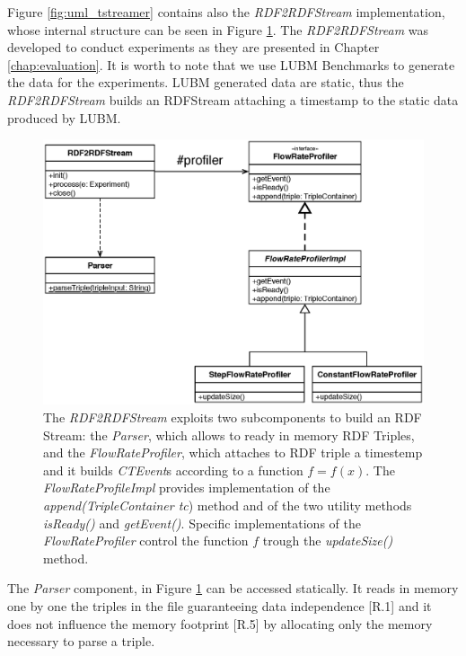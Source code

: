 Figure \ref{fig:uml_tstreamer} contains also the \textit{RDF2RDFStream} implementation, whose internal structure can be seen in Figure \ref{fig:uml_flowrateprofiler}. The \textit{RDF2RDFStream} was developed to conduct experiments as they are presented in Chapter \ref{chap:evaluation}.  It is worth to note that we use LUBM Benchmarks to generate the data for the experiments. LUBM generated data are static, thus the \textit{RDF2RDFStream} builds an RDFStream attaching a timestamp to the static data produced by LUBM. %

\begin{figure}[tbh]
  \centering
	\includegraphics[width=0.75\linewidth]{images/uml_flowrateprofiler}
	\caption[Internal Components of \textit{RDF2RDFStream} - UML Schema]{The \textit{RDF2RDFStream} exploits two subcomponents to build an RDF Stream: the \textit{Parser}, which allows to ready in memory RDF Triples, and the \textit{FlowRateProfiler}, which attaches to RDF triple a timestemp and it builds \textit{CTEvent}s according to a function $f=f(x)$. The \textit{FlowRateProfileImpl} provides implementation of the \textit{append(TripleContainer tc}) method and of the two utility methods \textit{isReady()} and \textit{getEvent()}. Specific implementations of the \textit{FlowRateProfiler} control the function $f$ trough the \textit{updateSize()} method.} 
  	\label{fig:uml_flowrateprofiler}
\end{figure}


The \textit{Parser} component, in Figure \ref{fig:uml_flowrateprofiler} can be accessed statically. It reads in memory one by one the triples in the file guaranteeing data independence [R.1] and it does not influence the memory footprint [R.5] by allocating only the memory necessary to parse a triple. 

